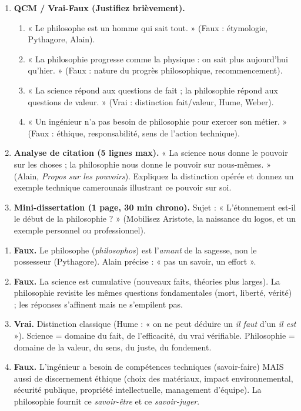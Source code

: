 \documentclass[11pt]{article}
\begin{document}
\begin{exercice}
\begin{enumerate}
\item \textbf{QCM / Vrai-Faux (Justifiez brièvement).}
\begin{enumerate}
\item « Le philosophe est un homme qui sait tout. » (Faux : étymologie, Pythagore, Alain).
\item « La philosophie progresse comme la physique : on sait plus aujourd'hui qu'hier. » (Faux : nature du progrès philosophique, recommencement).
\item « La science répond aux questions de fait ; la philosophie répond aux questions de valeur. » (Vrai : distinction fait/valeur, Hume, Weber).
\item « Un ingénieur n'a pas besoin de philosophie pour exercer son métier. » (Faux : éthique, responsabilité, sens de l'action technique).
\end{enumerate}
\item \textbf{Analyse de citation (5 lignes max).} « La science nous donne le pouvoir sur les choses ; la philosophie nous donne le pouvoir sur nous-mêmes. » (Alain, \emph{Propos sur les pouvoirs}). Expliquez la distinction opérée et donnez un exemple technique camerounais illustrant ce pouvoir sur soi.
\item \textbf{Mini-dissertation (1 page, 30 min chrono).} Sujet : « L'étonnement est-il le début de la philosophie ? » (Mobilisez Aristote, la naissance du logos, et un exemple personnel ou professionnel).
\end{enumerate}
\end{exercice}

\begin{corrige}
\begin{enumerate}
\item \textbf{Faux.} Le philosophe (\emph{philosophos}) est l'\emph{amant} de la sagesse, non le possesseur (Pythagore). Alain précise : « pas un savoir, un effort ».
\item \textbf{Faux.} La science est cumulative (nouveaux faits, théories plus larges). La philosophie revisite les mêmes questions fondamentales (mort, liberté, vérité) ; les réponses s'affinent mais ne s'empilent pas.
\item \textbf{Vrai.} Distinction classique (Hume : « on ne peut déduire un \emph{il faut} d'un \emph{il est} »). Science = domaine du fait, de l'efficacité, du vrai vérifiable. Philosophie = domaine de la valeur, du sens, du juste, du fondement.
\item \textbf{Faux.} L'ingénieur a besoin de compétences techniques (savoir-faire) MAIS aussi de discernement éthique (choix des matériaux, impact environnemental, sécurité publique, propriété intellectuelle, management d'équipe). La philosophie fournit ce \emph{savoir-être} et ce \emph{savoir-juger}.
\end{enumerate}
\end{corrige}
\end{document}
